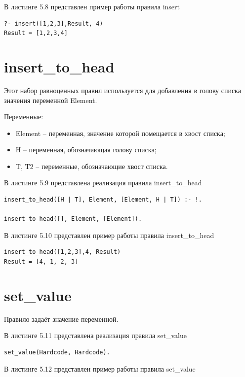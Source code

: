 \documentclass[12pt]{report}
\begin{document}
В листинге 5.8 представлен пример работы правила insert

\begin{lstlisting}[label=some-code, caption=пример работы правила insert]
?- insert([1,2,3],Result, 4)
Result = [1,2,3,4]
\end{lstlisting}
\section{insert\_to\_head}
Этот набор равноценных правил используется для добавления в голову списка значения переменной Element.

Переменные:
\begin{itemize}
\item Element – переменная, значение которой помещается в хвост списка;
\item H – переменная, обозначающая голову списка;
\item T, T2 – переменные, обозначающие хвост списка.
\end{itemize}

В листинге 5.9 представлена реализация правила insert\_to\_head

\begin{lstlisting}[label=some-code, caption=реализация правила insert\_to\_head]
insert_to_head([H | T], Element, [Element, H | T]) :- !.

insert_to_head([], Element, [Element]).
\end{lstlisting}
В листинге 5.10 представлен пример работы правила insert\_to\_head

\begin{lstlisting}[label=some-code, caption=пример работы правила insert\_to\_head]
insert_to_head([1,2,3],4, Result)
Result = [4, 1, 2, 3]
\end{lstlisting}

\section{set\_value}
Правило задаёт значение переменной.

В листинге 5.11 представлена реализация правила set\_value

\begin{lstlisting}[label=some-code, caption=реализация правила set\_value]
set_value(Hardcode, Hardcode).
\end{lstlisting}

В листинге 5.12 представлен пример работы правила set\_value
\end{document}
